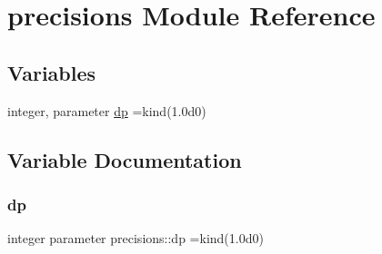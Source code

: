 \hypertarget{namespaceprecisions}{}\section{precisions Module Reference}
\label{namespaceprecisions}
\subsection*{Variables}
\begin{DoxyCompactItemize}
\item 
integer, parameter \mbox{\hyperlink{namespaceprecisions_a981a5ffa163c939af460d31f0e46fdab}{dp}} =kind(1.\+0d0)
\end{DoxyCompactItemize}


\subsection{Variable Documentation}
\mbox{\label{namespaceprecisions_a981a5ffa163c939af460d31f0e46fdab}} 
\subsubsection{\texorpdfstring{dp}{dp}}
{\footnotesize\ttfamily integer parameter precisions\+::dp =kind(1.\+0d0)}

